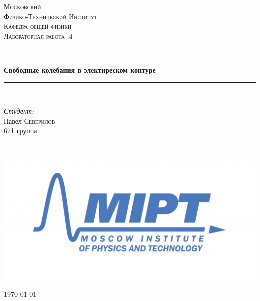 \documentclass[a4paper, 12pt]{article}
\newenvironment{bottompar}{\par\vspace*{\fill}}{\clearpage}
\begin{document}
\begin{titlepage}

\newcommand{\HRule}{\rule{\linewidth}{0.5mm}} %

\center %
 

\textsc{\LARGE Московский \\[0.5cm] Физико-Технический Институт}\\[1,5cm] %
\textsc{\Large Кафедра общей физики}\\[0.5cm] %
\textsc{\large Лабораторная работа .4}\\[0.5cm] %


\HRule
\\[0.4cm]
{ \huge \bfseries Свободные колебания в электиреском контуре}
\\[0.2cm] %
\HRule
\\[1.5cm]


 

	\begin{flushleft} \large
		\emph{Студент:}\\
		Павел \textsc{Северилов} \\
		671 группа
	\end{flushleft}


\begin{bottompar}
	\begin{center}
		\includegraphics[width = 80 mm]{logo.jpg}
	\end{center}
	{\large \today}

\end{bottompar}
\vfill %

\end{titlepage}
\end{document}
